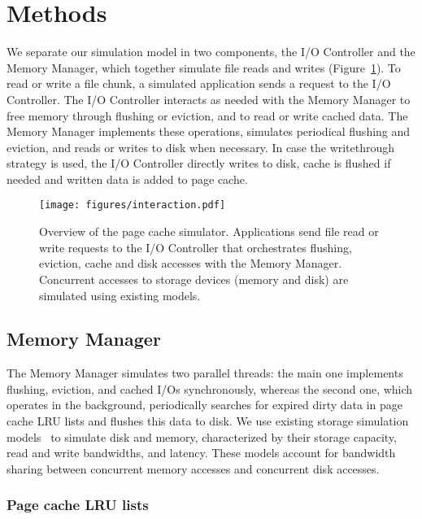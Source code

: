 \documentclass[conference]{IEEEtran}
\begin{document}
    \section{Methods}
    \label{method}
    We separate our simulation model in two components, the I/O
    Controller and the Memory Manager, which together simulate
    file reads and writes (Figure~\ref{fig:interaction}).
    To read or write a file chunk, a simulated application sends a
    request to the I/O Controller. The I/O Controller interacts as needed with
    the Memory Manager to free memory through flushing or eviction,
    and to read or write cached data. The Memory Manager
    implements these operations, simulates periodical flushing
    and eviction, and reads or writes to disk when necessary.
    In case the writethrough strategy is used, the I/O Controller directly writes to disk, 
    cache is flushed if needed and written data is added to page cache.

    \begin{figure}
           \centering
           \texttt{[image: figures/interaction.pdf]}
           \caption{Overview of the page cache simulator.
           Applications send file read or write requests to the
           I/O Controller that orchestrates flushing, eviction, cache
           and disk accesses with the Memory Manager. Concurrent accesses to storage
           devices (memory and disk) are simulated using existing models.}
           \label{fig:interaction}
    \end{figure}

    \subsection{Memory Manager}

    The Memory Manager simulates two parallel threads: the main one
    implements flushing, eviction, and cached I/Os synchronously, whereas
    the second one, which operates in the background, periodically searches for
    expired dirty data in page cache LRU lists and flushes this data to disk. We
    use existing storage simulation models~\cite{lebre2015} to simulate disk and
    memory, characterized by their storage capacity, read and write
    bandwidths, and latency. These models account for
    bandwidth sharing between concurrent memory accesses and concurrent disk accesses.

    \subsubsection{Page cache LRU lists}
\end{document}
